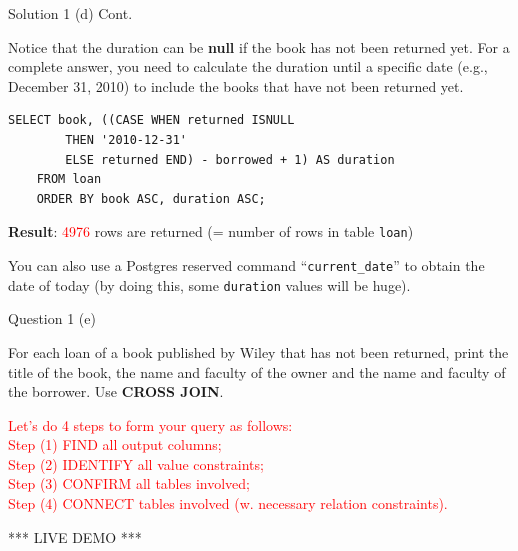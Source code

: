 \begin{frame}[fragile]{Solution 1 (d) Cont.}
	
Notice that the duration can be \textbf{null} if the book has not been returned yet. For a complete answer, you need to calculate the duration until a specific date (e.g., December 31, 2010) to include the books that have not been returned yet. \vspace{10pt}
	
\begin{lstlisting}
SELECT book, ((CASE	WHEN returned ISNULL 
		THEN '2010-12-31'
		ELSE returned END) - borrowed + 1) AS duration 
	FROM loan
	ORDER BY book ASC, duration ASC;
\end{lstlisting}
\vspace{10pt}
 
\textbf{Result}: \textcolor{red}{4976} rows are returned (= number of rows in table \texttt{loan})

\begin{exampleblock}{}
	You can also use a Postgres reserved command ``\texttt{current\_date}'' to obtain the date of today (by doing this, some \texttt{duration} values will be huge). 
\end{exampleblock}	
\end{frame}


\begin{frame}[fragile]{Question 1 (e)}

For each loan of a book published by Wiley that has not been returned, print the title of the book, the name and faculty of the owner and the name and faculty of the borrower. Use \textbf{CROSS JOIN}.
\vspace{15pt}

\textcolor{red}{Let's do 4 steps to form your query as follows:\\\vspace{5pt}
Step (1) FIND all output columns;\\
Step (2) IDENTIFY all value constraints;\\
Step (3) CONFIRM all tables involved;\\
Step (4) CONNECT tables involved (w. necessary relation constraints).}
\vspace{15pt}
\begin{center}
*** LIVE DEMO ***
\end{center}
\end{frame}

